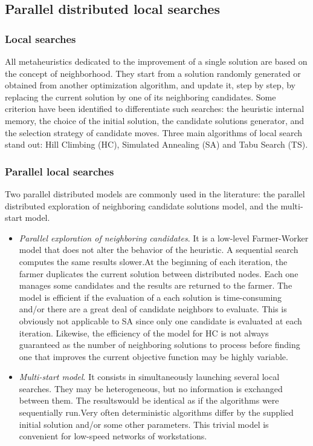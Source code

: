 \subsection{Parallel distributed local searches}\label{main_parallel_ls}
\subsubsection{Local searches}\label{main_local_searches}
All metaheuristics dedicated to the improvement of a single solution are based on the concept of neighborhood. They start from a solution randomly generated or obtained from another optimization algorithm, and update it, step by step, by replacing the current solution by one of its neighboring candidates. Some criterion have been identified to differentiate such searches: the heuristic internal memory, the choice of the initial solution, the candidate solutions generator, and the selection strategy of candidate moves. Three main algorithms of local search stand out: Hill Climbing (HC), Simulated Annealing (SA) and Tabu Search (TS).\subsubsection{Parallel local searches}\label{main_parallel_local_searches}
Two parallel distributed models are commonly used in the literature: the parallel distributed exploration of neighboring candidate solutions model, and the multi-start model. \begin{itemize}
\item {\em Parallel exploration of neighboring candidates\/}. It is a low-level Farmer-Worker model that does not alter the behavior of the heuristic. A sequential search computes the same results slower.At the beginning of each iteration, the farmer duplicates the current solution between distributed nodes. Each one manages some candidates and the results are returned to the farmer. The model is efficient if the evaluation of a each solution is time-consuming and/or there are a great deal of candidate neighbors to evaluate. This is obviously not applicable to SA since only one candidate is evaluated at each iteration. Likewise, the efficiency of the model for HC is not always guaranteed as the number of neighboring solutions to process before finding one that improves the current objective function may be highly variable.

\item {\em Multi-start model\/}. It consists in simultaneously launching several local searches. They may be heterogeneous, but no information is exchanged between them. The resultswould be identical as if the algorithms were sequentially run.Very often deterministic algorithms differ by the supplied initial solution and/or some other parameters. This trivial model is convenient for low-speed networks of workstations. \end{itemize}
